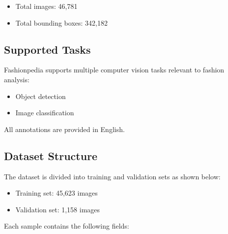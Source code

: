 \vspace{-1.25em}
\begin{itemize}
    \setlength\itemsep{-1.5em}
    \item Total images: 46,781
    \item Total bounding boxes: 342,182
\end{itemize}

\subsection{Supported Tasks}

Fashionpedia supports multiple computer vision tasks relevant to fashion analysis:

\vspace{-1.25em}
\begin{itemize}
    \setlength\itemsep{-1.5em}
    \item Object detection
    \item Image classification
\end{itemize}

All annotations are provided in English.

\subsection{Dataset Structure}

The dataset is divided into training and validation sets as shown below:

\vspace{-1.25em}
\begin{itemize}
    \setlength\itemsep{-1.5em}
    \item Training set: 45,623 images
    \item Validation set: 1,158 images
\end{itemize}

Each sample contains the following fields:


